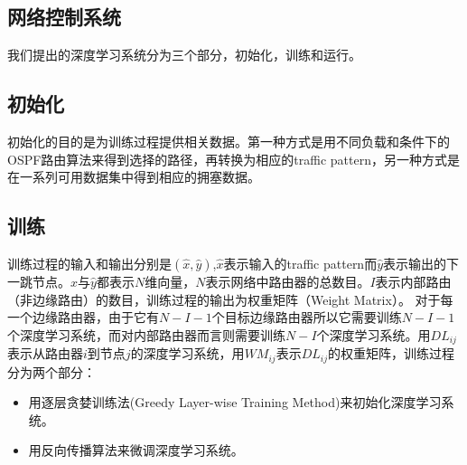 \documentclass[a4paper, 11pt]{article}
\begin{document}
\begin{CJK*}{UTF8}{gbsn}
\section{网络控制系统}
我们提出的深度学习系统分为三个部分，初始化，训练和运行。
\subsection{初始化}
初始化的目的是为训练过程提供相关数据。第一种方式是用不同负载和条件下的OSPF路由算法来得到选择的路径，再转换为相应的traffic pattern，另一种方式是在一系列可用数据集中得到相应的拥塞数据。
\subsection{训练}
训练过程的输入和输出分别是$(\hat{x},\hat{y})$,$\hat{x}$表示输入的traffic pattern而$\hat{y}$表示输出的下一跳节点。$\hat{x}$与$\hat{y}$都表示$N$维向量，$N$表示网络中路由器的总数目。$I$表示内部路由（非边缘路由）的数目，训练过程的输出为权重矩阵（Weight Matrix）。
对于每一个边缘路由器，由于它有$N-I-1$个目标边缘路由器所以它需要训练$N-I-1$个深度学习系统，而对内部路由器而言则需要训练$N-I$个深度学习系统。用$DL_{ij}$表示从路由器$i$到节点$j$的深度学习系统，用$WM_{ij}$表示$DL_{ij}$的权重矩阵，训练过程分为两个部分：
\begin{itemize}
  \item 用逐层贪婪训练法(Greedy Layer-wise Training Method)来初始化深度学习系统。
  \item 用反向传播算法来微调深度学习系统。
\end{itemize}


\end{CJK*}
\end{document}
